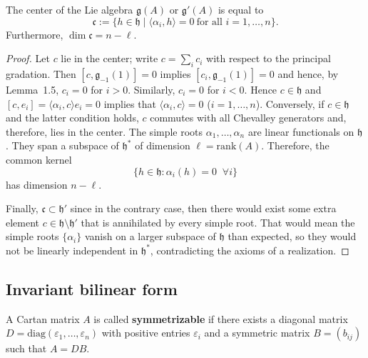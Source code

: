 \documentclass[12pt]{article}
\begin{document}
\begin{proposition}
    The center of the Lie algebra $\mathfrak{g}(A)$ or $\mathfrak{g}'(A)$ is equal to
    \[
        \mathfrak{c} := \{ h \in \mathfrak{h} \mid \langle \alpha_i, h \rangle = 0
        \ \text{for all } i=1,\dots,n \}.
    \]
    Furthermore, $\dim \mathfrak{c} = n-\ell$.
\end{proposition}

\begin{proof}
    Let $c$ lie in the center; write $c = \sum_i c_i$ with respect to the principal
    gradation. Then $[c,\mathfrak{g}_{-1}(1)] = 0$ implies
    $[c_i,\mathfrak{g}_{-1}(1)] = 0$ and hence, by Lemma~1.5, $c_i = 0$ for $i>0$.
    Similarly, $c_i=0$ for $i<0$. Hence $c \in \mathfrak{h}$ and
    $[c,e_i] = \langle \alpha_i,c \rangle e_i = 0$ implies that
    $\langle \alpha_i,c \rangle = 0$ ($i=1,\dots,n$). Conversely, if $c \in \mathfrak{h}$
    and the latter condition holds, $c$ commutes with all Chevalley generators and, therefore, lies in the center. The simple roots $\alpha_1,\dots,\alpha_n$ are linear functionals on $\mathfrak{h}$. They span a subspace of $\mathfrak{h}^*$ of dimension $\ell = \mathrm{rank}(A)$. Therefore, the common kernel
    \[
        \{ h \in \mathfrak{h} : \alpha_i(h)=0 \;\;\forall i\}
    \]
    has dimension $n-\ell$.

    Finally, $\mathfrak{c} \subset \mathfrak{h}'$ since in the contrary case, then there would exist some extra element $c \in \mathfrak{h} \setminus \mathfrak{h}'$ that is annihilated by every simple root. That would mean the simple roots $\{\alpha_i\}$ vanish on a larger subspace of $\mathfrak{h}$ than expected, so they would not be linearly independent in $\mathfrak{h}^*$, contradicting the axioms of a realization.
\end{proof}

\subsection{Invariant bilinear form}
\begin{definition}
    A Cartan matrix $A$ is called \textbf{symmetrizable} if there exists a diagonal matrix $D = \mathrm{diag}(\varepsilon_1,\dots,\varepsilon_n)$ with positive entries $\varepsilon_i$ and a symmetric matrix $B = (b_{ij})$ such that $A = DB$.
\end{definition}
\end{document}
